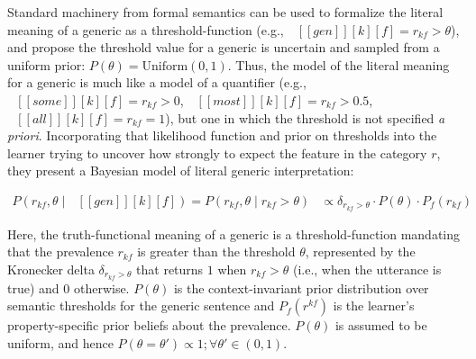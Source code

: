 \documentclass[floatsintext,doc]{apa6}
\newcommand{\denote}[1]{\mbox{ $[\![ #1 ]\!]$}}
\begin{document}
 
Standard machinery from formal semantics \cite{Montague1973} can be used to formalize the literal meaning of a generic as a threshold-function  (e.g., \(\mbox{ $[\![ gen ]\!][k][f]$} = r_{kf} > \theta\)), and  propose the threshold value for a generic is uncertain and sampled from a uniform prior: $P(\theta) = \text{Uniform}(0, 1)$. Thus, the model of the literal meaning for a generic is much like a model of a quantifier  (e.g., \(\mbox{ $[\![ some ]\!][k][f]$} = r_{kf} > 0\), \(\mbox{ $[\![ most ]\!][k][f]$} = r_{kf} > 0.5\), \(\mbox{ $[\![ all ]\!][k][f]$} = r_{kf} = 1\)), but one in which the threshold is not specified \emph{a priori}. 
Incorporating that likelihood function and prior on thresholds into the learner trying to uncover how strongly to expect the feature in the category $r$, they present a Bayesian model of literal generic interpretation: 

\begin{align}
P (r_{kf}, \theta \mid \denote{gen}[k][f]) = P (r_{kf}, \theta \mid r_{kf} >  \theta) &\propto \delta_{r_{kf} > \theta} \cdot P(\theta) \cdot P_f(r_{kf})  \label{eq:L0}
\end{align}


Here, the truth-functional meaning of a generic is a threshold-function mandating that the prevalence $r_{kf}$ is greater than the threshold \(\theta\), represented by the Kronecker delta $\delta_{r_{kf} > \theta}$ that returns \(1\) when \(r_{kf} > \theta\) (i.e., when the utterance is true) and \(0\) otherwise.
$P(\theta)$ is the context-invariant prior distribution over semantic thresholds for the generic sentence and $P_{f}(r^{kf})$ is the learner's property-specific prior beliefs about the prevalence.
$P(\theta)$ is assumed to be uniform, and hence $P(\theta = \theta') \propto 1; \forall \theta' \in (0, 1)$. 
\end{document}

